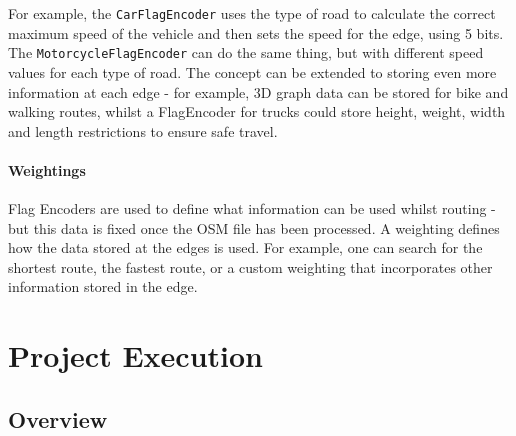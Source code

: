 \documentclass[ %
                    author={Alexander Hill},
                supervisor={Dr. Benjamin Sach},
                    degree={MEng},
                     title={MARMOSET: Multi Agent Real-time Multi-core Online
                     Simulation for Efficient Transportation},
                  subtitle={},
                      type={research},
                      year={2016} ]{dissertation}
\begin{document}
For example, the \texttt{CarFlagEncoder} uses the type of road to calculate the
correct maximum speed of the vehicle and then sets the speed for the edge, using
5 bits. The \texttt{MotorcycleFlagEncoder} can do the same thing, but with
different speed values for each type of road. The concept can be extended to
storing even more information at each edge - for example, 3D graph data can be
stored for bike and walking routes, whilst a FlagEncoder for trucks could store
height, weight, width and length restrictions to ensure safe travel.

\subsubsection{Weightings}

Flag Encoders are used to define what information can be used whilst routing -
but this data is fixed once the OSM file has been processed. A weighting defines
how the data stored at the edges is used. For example, one can search for the
shortest route, the fastest route, or a custom weighting that incorporates other
information stored in the edge.


\chapter{Project Execution}
\label{chap:execution}




\section{Overview}
\end{document}
